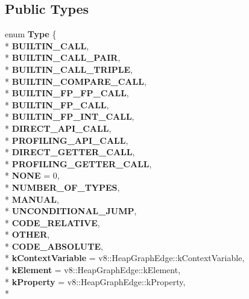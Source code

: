\subsection*{Public Types}
\begin{DoxyCompactItemize}
\item 
enum {\bfseries Type} \{ \\*
{\bfseries B\+U\+I\+L\+T\+I\+N\+\_\+\+C\+A\+LL}, 
\\*
{\bfseries B\+U\+I\+L\+T\+I\+N\+\_\+\+C\+A\+L\+L\+\_\+\+P\+A\+IR}, 
\\*
{\bfseries B\+U\+I\+L\+T\+I\+N\+\_\+\+C\+A\+L\+L\+\_\+\+T\+R\+I\+P\+LE}, 
\\*
{\bfseries B\+U\+I\+L\+T\+I\+N\+\_\+\+C\+O\+M\+P\+A\+R\+E\+\_\+\+C\+A\+LL}, 
\\*
{\bfseries B\+U\+I\+L\+T\+I\+N\+\_\+\+F\+P\+\_\+\+F\+P\+\_\+\+C\+A\+LL}, 
\\*
{\bfseries B\+U\+I\+L\+T\+I\+N\+\_\+\+F\+P\+\_\+\+C\+A\+LL}, 
\\*
{\bfseries B\+U\+I\+L\+T\+I\+N\+\_\+\+F\+P\+\_\+\+I\+N\+T\+\_\+\+C\+A\+LL}, 
\\*
{\bfseries D\+I\+R\+E\+C\+T\+\_\+\+A\+P\+I\+\_\+\+C\+A\+LL}, 
\\*
{\bfseries P\+R\+O\+F\+I\+L\+I\+N\+G\+\_\+\+A\+P\+I\+\_\+\+C\+A\+LL}, 
\\*
{\bfseries D\+I\+R\+E\+C\+T\+\_\+\+G\+E\+T\+T\+E\+R\+\_\+\+C\+A\+LL}, 
\\*
{\bfseries P\+R\+O\+F\+I\+L\+I\+N\+G\+\_\+\+G\+E\+T\+T\+E\+R\+\_\+\+C\+A\+LL}, 
\\*
{\bfseries N\+O\+NE} = 0, 
\\*
{\bfseries N\+U\+M\+B\+E\+R\+\_\+\+O\+F\+\_\+\+T\+Y\+P\+ES}, 
\\*
{\bfseries M\+A\+N\+U\+AL}, 
\\*
{\bfseries U\+N\+C\+O\+N\+D\+I\+T\+I\+O\+N\+A\+L\+\_\+\+J\+U\+MP}, 
\\*
{\bfseries C\+O\+D\+E\+\_\+\+R\+E\+L\+A\+T\+I\+VE}, 
\\*
{\bfseries O\+T\+H\+ER}, 
\\*
{\bfseries C\+O\+D\+E\+\_\+\+A\+B\+S\+O\+L\+U\+TE}, 
\\*
{\bfseries k\+Context\+Variable} = v8\+:\+:Heap\+Graph\+Edge\+:\+:k\+Context\+Variable, 
\\*
{\bfseries k\+Element} = v8\+:\+:Heap\+Graph\+Edge\+:\+:k\+Element, 
\\*
{\bfseries k\+Property} = v8\+:\+:Heap\+Graph\+Edge\+:\+:k\+Property, 
\\*

\end{DoxyCompactItemize}
